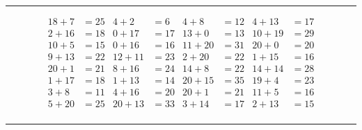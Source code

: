 \documentclass{article}
\begin{document}
\begin{sloppy}
\hrule
\begin{align*}
    {18} + {7} &= {25} & {4} + {2} &= {6} & {4} + {8} &= {12} & {4} + {13} &= {17} \\
    {2} + {16} &= {18} & {0} + {17} &= {17} & {13} + {0} &= {13} & {10} + {19} &= {29} \\
    {10} + {5} &= {15} & {0} + {16} &= {16} & {11} + {20} &= {31} & {20} + {0} &= {20} \\
    {9} + {13} &= {22} & {12} + {11} &= {23} & {2} + {20} &= {22} & {1} + {15} &= {16} \\
    {20} + {1} &= {21} & {8} + {16} &= {24} & {14} + {8} &= {22} & {14} + {14} &= {28} \\
    {1} + {17} &= {18} & {1} + {13} &= {14} & {20} + {15} &= {35} & {19} + {4} &= {23} \\
    {3} + {8} &= {11} & {4} + {16} &= {20} & {20} + {1} &= {21} & {11} + {5} &= {16} \\
    {5} + {20} &= {25} & {20} + {13} &= {33} & {3} + {14} &= {17} & {2} + {13} &= {15} \\
\end{align*}
\hrule
\end{sloppy}
\end{document}
